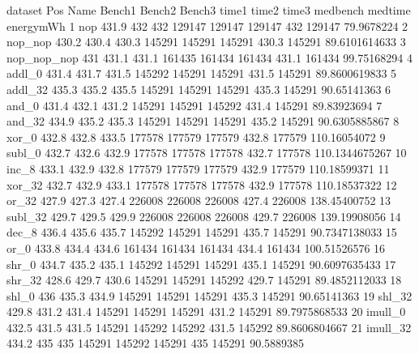 \begin{filecontents}{dataset}
Pos	Name	Bench1	Bench2	Bench3	time1	time2	time3	medbench	medtime	energymWh
1	nop	431.9	432	432	129147	129147	129147	432	129147	79.9678224
2	nop\_nop	430.2	430.4	430.3	145291	145291	145291	430.3	145291	89.6101614633
3	nop\_nop\_nop	431	431.1	431.1	161435	161434	161434	431.1	161434	99.75168294
4	addl\_0	431.4	431.7	431.5	145292	145291	145291	431.5	145291	89.8600619833
5	addl\_32	435.3	435.2	435.5	145291	145291	145291	435.3	145291	90.65141363
6	and\_0	431.4	432.1	431.2	145291	145291	145292	431.4	145291	89.83923694
7	and\_32	434.9	435.2	435.3	145291	145291	145291	435.2	145291	90.6305885867
8	xor\_0	432.8	432.8	433.5	177578	177579	177579	432.8	177579	110.16054072
9	subl\_0	432.7	432.6	432.9	177578	177578	177578	432.7	177578	110.1344675267
10	inc\_8	433.1	432.9	432.8	177579	177579	177579	432.9	177579	110.18599371
11	xor\_32	432.7	432.9	433.1	177578	177578	177578	432.9	177578	110.18537322
12	or\_32	427.9	427.3	427.4	226008	226008	226008	427.4	226008	138.45400752
13	subl\_32	429.7	429.5	429.9	226008	226008	226008	429.7	226008	139.19908056
14	dec\_8	436.4	435.6	435.7	145292	145291	145291	435.7	145291	90.7347138033
15	or\_0	433.8	434.4	434.6	161434	161434	161434	434.4	161434	100.51526576
16	shr\_0	434.7	435.2	435.1	145292	145291	145291	435.1	145291	90.6097635433
17	shr\_32	428.6	429.7	430.6	145291	145291	145292	429.7	145291	89.4852112033
18	shl\_0	436	435.3	434.9	145291	145291	145291	435.3	145291	90.65141363
19	shl\_32	429.8	431.2	431.4	145291	145291	145291	431.2	145291	89.7975868533
20	imull\_0	432.5	431.5	431.5	145291	145292	145292	431.5	145292	89.8606804667
21	imull\_32	434.2	435	435	145291	145292	145291	435	145291	90.5889385
\end{filecontents}



